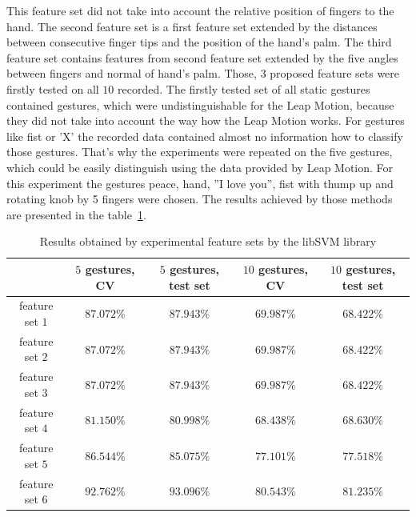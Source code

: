 This feature set did not take into account the relative position of fingers to the hand.
The second feature set is a first feature set extended by the distances between consecutive finger tips and the position of the hand's palm.
The third feature set contains features from second feature set extended by the five angles between fingers and normal of hand's palm.
Those, 3 proposed feature sets were firstly tested on all $10$ recorded.
The firstly tested set of all static gestures contained gestures, which were undistinguishable for the Leap Motion, because they did not take into account the way how the Leap Motion works. 
For gestures like fist or 'X' the recorded data contained almost no information how to classify those gestures.
That's why the experiments were repeated on the five gestures, which could be easily distinguish using the data provided by Leap Motion. 
For this experiment the gestures peace, hand, ''I love you'', fist with thump up and rotating knob by 5 fingers were chosen.
The results achieved by those methods are presented in the table~\ref{staticfeat}.

\begin{table}[htp!]
	\label{staticfeat}
	\caption{Results obtained by experimental feature sets by the libSVM library}
    \begin{tabular}{|c|c|c|c|c|}
    \hline
    ~                                                   & $5$ gestures, CV & $5$ gestures, test set & $10$ gestures, CV  & $10$ gestures, test set \\ \hline
    feature set $1$                     & $87.072\%$ & $87.943\%$ & $69.987\%$ & $68.422\%$   \\ \hline
    feature set $2$                     & $87.072\%$ & $87.943\%$ & $69.987\%$ & $68.422\%$          \\ \hline
    feature set $3$                     & $87.072\%$ & $87.943\%$ & $69.987\%$ & $68.422\%$           \\ \hline
    feature set $4$                     & $81.150\%$ & $80.998\%$ & $68.438\%$ & $68.630\%$          \\ \hline
    feature set $5$                     & $86.544\%$ & $85.075\%$ & $77.101\%$ & $77.518\%$          \\ \hline
    feature set $6$                     & $92.762\%$ & $93.096\%$ & $80.543\%$ & $81.235\%$           \\ \hline
    \end{tabular}
\end{table}

